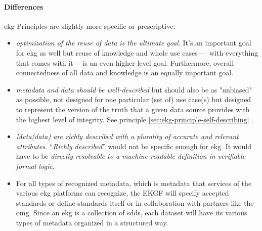 \paragraph{Differences}

\gls{ekg} Principles are slightly more specific or prescriptive:

\begin{itemize}
    \item \textit{optimization of the reuse of data is the ultimate goal}.
          It's an important goal for \gls{ekg} as well but reuse of knowledge and whole use cases\,---\,%
          with everything that comes with it\,---\,is an even higher level goal.
          Furthermore, overall connectedness of all data and knowledge is an equally important goal.
    \item \textit{metadata and data should be well-described} but should also be as "unbiased" as possible, not designed
          for one particular (set of) use case(s) but designed to represent the version of the truth that a given data
          source provides with the highest level of integrity.
          See principle \ref{sec:ekg-principle-self-describing} .
    \item \textit{Meta(data) are richly described with a plurality of accurate and relevant attributes}.
          \enquote{\textit{Richly described}} would not be specific enough for \gls{ekg}.
          It would have to be \textit{directly resolvable to a machine-readable definition in verifiable formal logic}.
    \item For all types of recognized metadata, which is metadata that services of the various \gls{ekg} platforms can
          recognize, the EKGF will specify accepted standards or define standards itself or in
          collaboration with partners like the \gls{omg}.
          Since an \gls{ekg} is a collection of \glspl{sdd}, each dataset will have its various types of metadata
          organized in a structured way.
\end{itemize}

